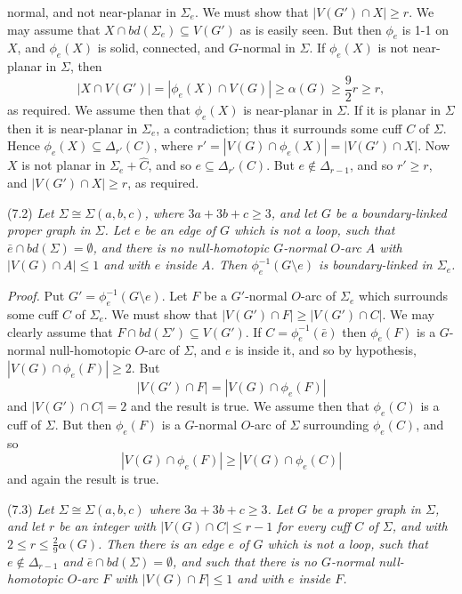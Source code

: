 \noindent normal, and not near-planar in $\Sigma_e$. We must show that $|V(G') \cap X| \ge r$. We may assume that $X \cap bd(\Sigma_e) \subseteq V(G')$ as is easily seen. But then $\phi_e$ is 1-1 on $X$, and $\phi_e(X)$ is solid, connected, and $G$-normal in $\Sigma$. If $\phi_e(X)$ is not near-planar in $\Sigma$, then
\begin{equation*}
|X \cap V(G')| = |\phi_e(X) \cap V(G)| \ge \alpha(G) \ge \frac{9}{2}r \ge r,
\end{equation*}
as required. We assume then that $\phi_e(X)$ is near-planar in $\Sigma$. If it is planar in $\Sigma$ then it is near-planar in $\Sigma_e$, a contradiction; thus it surrounds some cuff $C$ of $\Sigma$. Hence $\phi_e(X) \subseteq \Delta_{r'}(C)$, where $r' = |V(G) \cap \phi_e(X)| = |V(G') \cap X|$. Now $X$ is not planar in $\Sigma_e + \hat{C}$, and so $e \subseteq \Delta_{r'}(C)$. But $e \notin \Delta_{r-1}$, and so $r' \ge r$, and $|V(G') \cap X| \ge r$, as required.

\stmt
(7.2) \textit{Let $\Sigma \cong \Sigma(a, b, c)$, where $3a + 3b + c \ge 3$, and let $G$ be a boundary-linked proper graph in $\Sigma$. Let $e$ be an edge of $G$ which is not a loop, such that $\bar{e} \cap bd(\Sigma) = \emptyset$, and there is no null-homotopic $G$-normal $O$-arc $A$ with $|V(G) \cap A| \le 1$ and with $e$ inside $A$. Then $\phi_e^{-1}(G \setminus e)$ is boundary-linked in $\Sigma_e$.}

\textit{Proof.} Put $G' = \phi_e^{-1}(G \setminus e)$. Let $F$ be a $G'$-normal $O$-arc of $\Sigma_e$ which surrounds some cuff $C$ of $\Sigma_e$. We must show that $|V(G') \cap F| \ge |V(G') \cap C|$. We may clearly assume that $F \cap bd(\Sigma') \subseteq V(G')$. If $C = \phi_e^{-1}(\bar{e})$ then $\phi_e(F)$ is a $G$-normal null-homotopic $O$-arc of $\Sigma$, and $e$ is inside it, and so by hypothesis, $|V(G) \cap \phi_e(F)| \ge 2$. But
\begin{equation*}
|V(G') \cap F| = |V(G) \cap \phi_e(F)|
\end{equation*}
and $|V(G') \cap C| = 2$ and the result is true. We assume then that $\phi_e(C)$ is a cuff of $\Sigma$. But then $\phi_e(F)$ is a $G$-normal $O$-arc of $\Sigma$ surrounding $\phi_e(C)$, and so
\begin{equation*}
|V(G) \cap \phi_e(F)| \ge |V(G) \cap \phi_e(C)|
\end{equation*}
and again the result is true.

\stmt
(7.3) \textit{Let $\Sigma \cong \Sigma(a, b, c)$ where $3a + 3b + c \ge 3$. Let $G$ be a proper graph in $\Sigma$, and let $r$ be an integer with $|V(G) \cap C| \le r - 1$ for every cuff $C$ of $\Sigma$, and with $2 \le r \le \frac{2}{9}\alpha(G)$. Then there is an edge $e$ of $G$ which is not a loop, such that $e \notin \Delta_{r-1}$ and $\bar{e} \cap bd(\Sigma) = \emptyset$, and such that there is no $G$-normal null-homotopic $O$-arc $F$ with $|V(G) \cap F| \le 1$ and with $e$ inside $F$.}

